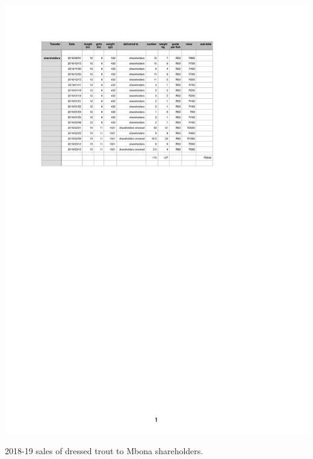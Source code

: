 \begin{table}[H]
  \centering
  \includegraphics[scale = 1.2]{tables/TablesShareholderSales.pdf}
   \caption{2018-19 sales of dressed trout to Mbona shareholders.}
  \label{tab:ShareholderSales2018}
\end{table}

